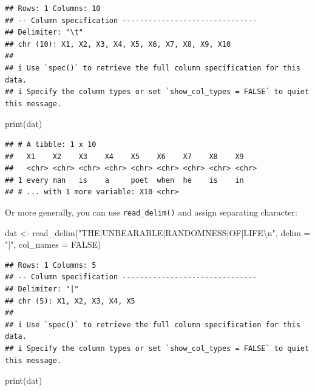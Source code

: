 \documentclass[
  12pt,
]{krantz}
\makeatletter
\newenvironment{Shaded}{\begin{snugshade}}{\end{snugshade}}
\newcommand{\AttributeTok}[1]{\textcolor[rgb]{0.61,0.61,0.61}{#1}}
\newcommand{\ConstantTok}[1]{\textcolor[rgb]{0,0,0}{#1}}
\newcommand{\FunctionTok}[1]{\textcolor[rgb]{0,0,0}{#1}}
\newcommand{\NormalTok}[1]{#1}
\newcommand{\OtherTok}[1]{\textcolor[rgb]{0.37,0.37,0.37}{#1}}
\newcommand{\SpecialCharTok}[1]{\textcolor[rgb]{0,0,0}{#1}}
\newcommand{\StringTok}[1]{\textcolor[rgb]{0.5,0.5,0.5}{#1}}
\newenvironment{kframe}{%
\medskip{}
\setlength{\fboxsep}{.8em}
 \def\at@end@of@kframe{}%
 \ifinner\ifhmode%
  \def\at@end@of@kframe{\end{minipage}}%
  \begin{minipage}{\columnwidth}%
 \fi\fi%
 \def\FrameCommand##1{\hskip\@totalleftmargin \hskip-\fboxsep
 \colorbox{shadecolor}{##1}\hskip-\fboxsep
     \hskip-\linewidth \hskip-\@totalleftmargin \hskip\columnwidth}%
 \MakeFramed {\advance\hsize-\width
   \@totalleftmargin\z@ \linewidth\hsize
   \@setminipage}}%
 {\par\unskip\endMakeFramed%
 \at@end@of@kframe}
\renewenvironment{Shaded}{\begin{kframe}}{\end{kframe}}
\makeatother
\begin{document}
\begin{verbatim}
## Rows: 1 Columns: 10
## -- Column specification -------------------------------
## Delimiter: "\t"
## chr (10): X1, X2, X3, X4, X5, X6, X7, X8, X9, X10
## 
## i Use `spec()` to retrieve the full column specification for this data.
## i Specify the column types or set `show_col_types = FALSE` to quiet this message.
\end{verbatim}

\begin{Shaded}
\begin{Highlighting}[]
\FunctionTok{print}\NormalTok{(dat)}
\end{Highlighting}
\end{Shaded}

\begin{verbatim}
## # A tibble: 1 x 10
##   X1    X2    X3    X4    X5    X6    X7    X8    X9   
##   <chr> <chr> <chr> <chr> <chr> <chr> <chr> <chr> <chr>
## 1 every man   is    a     poet  when  he    is    in   
## # ... with 1 more variable: X10 <chr>
\end{verbatim}

Or more generally, you can use \texttt{read\_delim()} and assign separating character:

\begin{Shaded}
\begin{Highlighting}[]
\NormalTok{dat }\OtherTok{\textless{}{-}} \FunctionTok{read\_delim}\NormalTok{(}\StringTok{"THE|UNBEARABLE|RANDOMNESS|OF|LIFE}\SpecialCharTok{\textbackslash{}n}\StringTok{"}\NormalTok{, }
    \AttributeTok{delim =} \StringTok{"|"}\NormalTok{, }\AttributeTok{col\_names =} \ConstantTok{FALSE}\NormalTok{)}
\end{Highlighting}
\end{Shaded}

\begin{verbatim}
## Rows: 1 Columns: 5
## -- Column specification -------------------------------
## Delimiter: "|"
## chr (5): X1, X2, X3, X4, X5
## 
## i Use `spec()` to retrieve the full column specification for this data.
## i Specify the column types or set `show_col_types = FALSE` to quiet this message.
\end{verbatim}

\begin{Shaded}
\begin{Highlighting}[]
\FunctionTok{print}\NormalTok{(dat)}
\end{Highlighting}
\end{Shaded}
\end{document}
